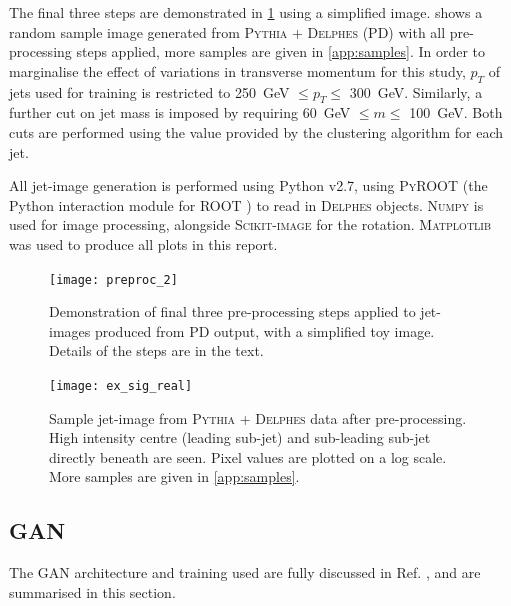 \documentclass[twocolumn]{article}
\newcommand{\pkg}[1]{\textsc{#1}}
\begin{document}
The final three steps are demonstrated in \cref{fig:preproc} using a simplified image.  shows a random sample image generated from \pkg{Pythia} + \pkg{Delphes} (PD) with all pre-processing steps applied, more samples are given in \cref{app:samples}. In order to marginalise the effect of variations in transverse momentum for this study, $p_T$ of jets used for training is restricted to \SI{250}{\giga\electronvolt} $\leq p_T \leq$ \SI{300}{\giga\electronvolt}. Similarly, a further cut on jet mass is imposed by requiring \SI{60}{\giga\electronvolt} $\leq m \leq$ \SI{100}{\giga\electronvolt}. Both cuts are performed using the value provided by the clustering algorithm for each jet.

All jet-image generation is performed using Python v2.7, using \pkg{PyROOT} (the Python interaction module for \pkg{ROOT} \cite{root}) to read in \pkg{Delphes} objects. \pkg{Numpy} \cite{numpy} is used for image processing, alongside \pkg{Scikit-image} \cite{skimage} for the rotation. \pkg{Matplotlib} \cite{matplotlib} was used to produce all plots in this report.

\begin{figure}[!htbp]
	\centering
	\texttt{[image: preproc\_2]}
%	
	
	\caption{Demonstration of final three pre-processing steps applied to jet-images produced from PD output, with a simplified toy image. Details of the steps are in the text.}
	\label{fig:preproc}
	
\end{figure}

\begin{figure}[H]
	\centering
	\texttt{[image: ex\_sig\_real]}
	
	\caption{Sample jet-image from \pkg{Pythia} + \pkg{Delphes} data after pre-processing. High intensity centre (leading sub-jet) and sub-leading sub-jet directly beneath are seen. Pixel values are plotted on a log scale. More samples are given in \cref{app:samples}.}
	\label{fig:ex_sig_real}
	
\end{figure}

\subsection{GAN}
The GAN architecture and training used are fully discussed in Ref. \cite{de2017learning}, and are summarised in this section.
 
\end{document}

